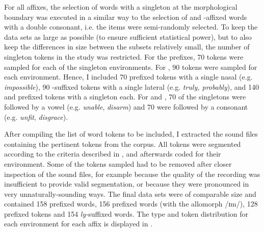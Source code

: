For all affixes, the selection of words with a singleton at the morphological boundary was executed in a similar way to the selection of  and -affixed words with a double consonant, i.e. the items were semi-randomly selected. To keep the data sets as large as possible (to ensure sufficient statistical power), but to also keep the differences in size between the subsets relatively small, the number of singleton tokens in the study was restricted. For the prefixes, 70 tokens were sampled for each of the singleton environments. For , 90 tokens were sampled for each environment. 
Hence, I included 70 prefixed tokens with a single nasal (e.g. \textit{impossible}),  90 -suffixed tokens with a single lateral (e.g. \textit{truly, probably}), and 140  and prefixed tokens with a singleton each. For  and , 70 of the singletons were followed by a vowel (e.g. \textit{unable}, \textit{disarm}) and 70 were followed by a consonant (e.g. \textit{unfit}, \textit{disgrace}).

After compiling the list of word tokens to be included, I extracted the sound files containing the pertinent tokens from the corpus. All tokens were segmented according to the criteria described in , and afterwards coded for their environment.
Some of the tokens sampled had to be removed after closer inspection of the sound files,  for example because the quality of the recording was insufficient to provide valid segmentation, or because they were pronounced in very unnaturally-sounding ways. The final data sets were of comparable size and contained 158 prefixed words, 156 prefixed words (with the allomorph /ɪm/), 128 prefixed tokens and 154 \textit{ly-}suffixed words.  The type and token distribution for each environment for each affix is displayed  in .



